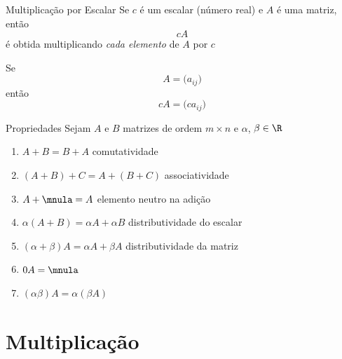 \documentclass[fleqn,aspectratio=169,12pt]{beamer}
\begin{document}



\begin{frame}{Multiplicação por Escalar}
  Se $c$ é um escalar (número real) e $A$ é uma matriz,
  \pause
  então
  \[
    cA
  \]
  \pause
  é obtida multiplicando \emph{cada elemento} de $A$ por $c$

  \pause
  Se
  \[
    A = \big( a_{ij}\big)
  \]
  \pause
  então
  \[
    cA = \big( ca_{ij} \big)
  \]
\end{frame}




\begin{frame}{Propriedades}
Sejam $A$ e $B$ matrizes de ordem $m \times n$ e $\alpha$, $\beta \in \R$
\pause
\begin{enumerate}[<+->][(i)\;]
  \setlength\itemsep{1.3ex}
  \item $A + B = B + A$                               \tabto{67mm} comutatividade
  \item $(A + B) + C = A + (B + C)$                   \tabto{67mm} associatividade
  \item $A + \mnula = A$                              \tabto{67mm} elemento neutro na adição
  \item $\alpha (A + B) = \alpha A + \alpha B$        \tabto{67mm} distributividade do escalar
  \item $(\alpha + \beta)A = \alpha A + \beta A$      \tabto{67mm} distributividade da matriz
  \item $0A = \mnula$
  \item $(\alpha \beta)A = \alpha (\beta A)$
\end{enumerate}
\end{frame}




\section{Multiplicação}
\end{document}
